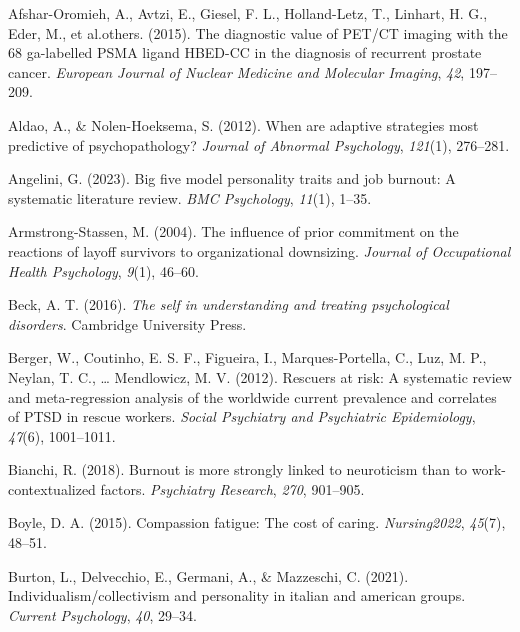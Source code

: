 \documentclass[
  man]{apa6}
\newlength{\cslhangindent}
\newlength{\cslentryspacingunit} %
\newenvironment{CSLReferences}[2] %
 {%
  \setlength{\parindent}{0pt}
  \ifodd #1
  \let\oldpar\par
  \def\par{\hangindent=\cslhangindent\oldpar}
  \fi
  \setlength{\parskip}{#2\cslentryspacingunit}
 }%
 {}
\begin{document}
\hypertarget{refs}{}
\begin{CSLReferences}{1}{0}
\leavevmode{}%
Afshar-Oromieh, A., Avtzi, E., Giesel, F. L., Holland-Letz, T., Linhart, H. G., Eder, M., et al.others. (2015). The diagnostic value of PET/CT imaging with the 68 ga-labelled PSMA ligand HBED-CC in the diagnosis of recurrent prostate cancer. \emph{European Journal of Nuclear Medicine and Molecular Imaging}, \emph{42}, 197--209.

\leavevmode{}%
Aldao, A., \& Nolen-Hoeksema, S. (2012). When are adaptive strategies most predictive of psychopathology? \emph{Journal of Abnormal Psychology}, \emph{121}(1), 276--281.

\leavevmode{}%
Angelini, G. (2023). Big five model personality traits and job burnout: A systematic literature review. \emph{BMC Psychology}, \emph{11}(1), 1--35.

\leavevmode{}%
Armstrong-Stassen, M. (2004). The influence of prior commitment on the reactions of layoff survivors to organizational downsizing. \emph{Journal of Occupational Health Psychology}, \emph{9}(1), 46--60.

\leavevmode{}%
Beck, A. T. (2016). \emph{The self in understanding and treating psychological disorders}. Cambridge University Press.

\leavevmode{}%
Berger, W., Coutinho, E. S. F., Figueira, I., Marques-Portella, C., Luz, M. P., Neylan, T. C., \ldots{} Mendlowicz, M. V. (2012). Rescuers at risk: A systematic review and meta-regression analysis of the worldwide current prevalence and correlates of PTSD in rescue workers. \emph{Social Psychiatry and Psychiatric Epidemiology}, \emph{47}(6), 1001--1011.

\leavevmode{}%
Bianchi, R. (2018). Burnout is more strongly linked to neuroticism than to work-contextualized factors. \emph{Psychiatry Research}, \emph{270}, 901--905.

\leavevmode{}%
Boyle, D. A. (2015). Compassion fatigue: The cost of caring. \emph{Nursing2022}, \emph{45}(7), 48--51.

\leavevmode{}%
Burton, L., Delvecchio, E., Germani, A., \& Mazzeschi, C. (2021). Individualism/collectivism and personality in italian and american groups. \emph{Current Psychology}, \emph{40}, 29--34.


\end{CSLReferences}
\end{document}

